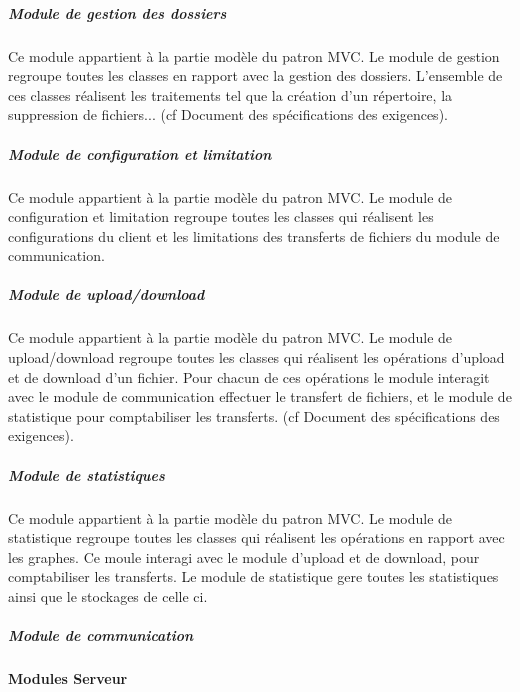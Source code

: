 \documentclass[10pt,a4paper]{report}
\begin{document}
	
				\subparagraph{Module de gestion des dossiers}
				\begin{flushleft}
				Ce module appartient à la partie modèle du patron MVC. Le module de gestion regroupe  toutes les classes en rapport avec la gestion des dossiers. L'ensemble de ces classes réalisent les traitements tel que la création d'un répertoire, la suppression de fichiers... (cf Document des spécifications des exigences).\\ 
				\end{flushleft}
	
				\subparagraph{Module de configuration et limitation}	
				\begin{flushleft}
				Ce module appartient à la partie modèle du patron MVC. Le module de configuration et limitation regroupe toutes les classes qui réalisent les configurations du client et les limitations des transferts de fichiers du module de communication.
				\end{flushleft}
	
				\subparagraph{Module de upload/download}
				\begin{flushleft}
				Ce module appartient à la partie modèle du patron MVC. Le module de upload/download regroupe toutes les classes qui réalisent les opérations d'upload et de download d'un fichier. Pour chacun de ces opérations le module interagit avec le module de communication effectuer le transfert de fichiers, et le module de statistique pour comptabiliser les transferts. (cf Document des spécifications des exigences).
				\end{flushleft}
	
				\subparagraph{Module de statistiques}
				\begin{flushleft}
				Ce module appartient à la partie modèle du patron MVC. Le module de statistique regroupe toutes les classes qui réalisent les opérations en rapport avec les graphes. Ce moule interagi avec le module d'upload et de download, pour comptabiliser les transferts. Le module de statistique gere toutes les statistiques ainsi que le stockages de celle ci.
				\end{flushleft}
				
				\subparagraph{Module de communication}

\newpage
			\paragraph{Modules Serveur}
\end{document}
